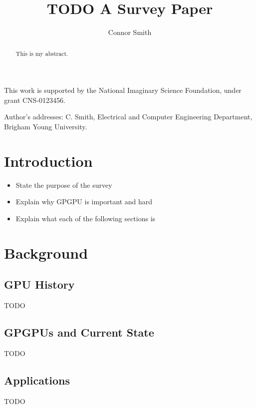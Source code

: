 \documentclass[prodmode,acmtecs]{acmsmall} %
\begin{document}

\title{TODO A Survey Paper}
\author{Connor Smith
}

\begin{abstract}
This is my abstract.
\end{abstract}



\begin{bottomstuff}
This work is supported by the National Imaginary Science Foundation, under
grant CNS-0123456.

Author's addresses: C. Smith, Electrical and Computer Engineering Department,
Brigham Young University.
\end{bottomstuff}

\maketitle


\section{Introduction}
\begin{itemize}
\item State the purpose of the survey
\item Explain why GPGPU is important and hard
\item Explain what each of the following sections is
\end{itemize}

\section{Background}
\subsection{GPU History}
TODO
\subsection{GPGPUs and Current State}
TODO
\subsection{Applications}
TODO
\end{document}
